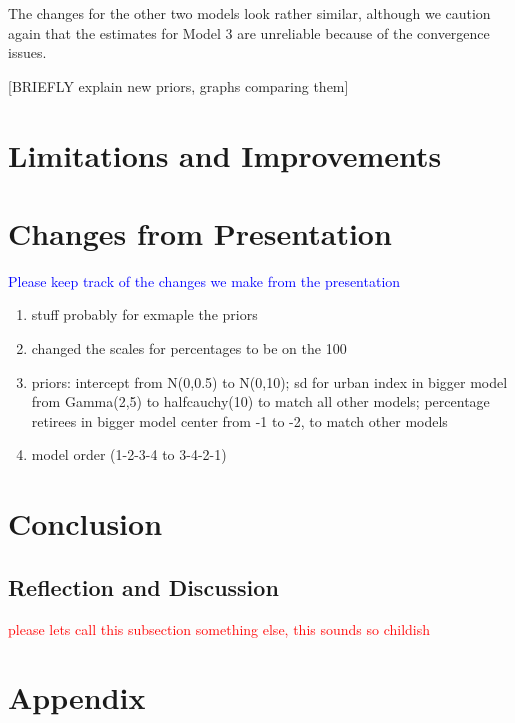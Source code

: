\documentclass[12pt]{article}
\newcommand{\blue}[1]{\textcolor{blue}{#1}}
\begin{document}
The changes for the other two models look rather similar, although we caution again that the estimates for Model 3 are unreliable because of the convergence issues.





[BRIEFLY explain new priors, graphs comparing them]



\section{Limitations and Improvements}


\section{Changes from Presentation}
\blue{Please keep track of the changes we make from the presentation}
\begin{enumerate}
	\item stuff probably for exmaple the priors 
	\item changed the scales for percentages to be on the 100
	\item priors: intercept from N(0,0.5) to N(0,10); sd for urban index in bigger model from Gamma(2,5) to halfcauchy(10) to match all other models; percentage retirees in bigger model center from -1 to -2, to match other models
	\item model order (1-2-3-4 to 3-4-2-1) 
\end{enumerate}

\section{Conclusion}



\subsection{Reflection and Discussion}

\textcolor{red}{please lets call this subsection something else, this sounds so childish}




\newpage
\appendix
\setcounter{table}{0}
\renewcommand{\thetable}{A\arabic{table}}
\setcounter{figure}{0}
\renewcommand{\thefigure}{A\arabic{figure}}

\section*{Appendix}
\end{document}
